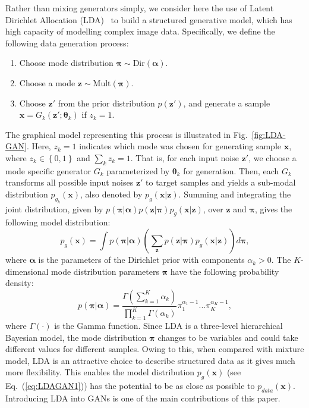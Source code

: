 \documentclass{article}
\begin{document}
Rather than mixing generators simply, we consider here the use of Latent Dirichlet Allocation (LDA)~\cite{blei2003latent} to build a structured generative model, which has high capacity of modelling complex image data.
Specifically, we define the following data generation process:
\begin{enumerate}
\item Choose mode distribution $\bm{\pi}\sim\text{Dir}(\bm{\alpha})$.
\item Choose a mode $\mathbf{z}\sim\text{Mult}(\bm{\pi})$.
\item Choose $\mathbf{z}'$ from the prior distribution $p\left(\mathbf{z}'\right)$, and generate a sample $\mathbf{x}=G_{k}\left(\mathbf{z}'; \bm{\theta}_k\right)$ if $z_k=1$.
\end{enumerate}
The graphical model representing this process is illustrated in Fig.~\ref{fig:LDA-GAN}.
Here, $z_k=1$ indicates which mode was chosen for generating sample $\mathbf{x}$, where $z_k\in\left\{0,1\right\}$ and $\sum_k z_k=1$.
That is, for each input noise $\mathbf{z}'$, we choose a mode specific generator $G_k$ parameterized by $\bm{\theta}_k$ for generation.
Then, each $G_k$ transforms all possible input noises $\mathbf{z}'$ to target samples and yields a sub-modal distribution $p_{g_k}\left(\mathbf{x}\right)$, also denoted by $p_g\left(\mathbf{x}|\mathbf{z}\right)$.
Summing and integrating the joint distribution, given by $p\left(\bm{\pi}|\bm{\alpha}\right)p\left(\mathbf{z}|\bm{\pi}\right) p_g\left(\mathbf{x}|\mathbf{z}\right)$, over $\mathbf{z}$ and $\bm{\pi}$, gives the following model distribution:
\begin{equation}
p_g\left(\mathbf{x}\right)
=
\int p\left(\bm{\pi}|\bm{\alpha}\right)\left(\sum_{\mathbf{z}} p\left(\mathbf{z}|\bm{\pi}\right) p_g\left(\mathbf{x}|\mathbf{z}\right) \right)d\bm{\pi},
\label{eq:LDAGAN1}
\end{equation}
where $\bm{\alpha}$ is the parameters of the Dirichlet prior with components $\alpha_k>0$.
\noindent The $K$-dimensional mode distribution parameters $\bm{\pi}$ have the following probability density:
\begin{equation}
p\left( \bm{\pi}|\bm{\alpha} \right)
=
\frac{\Gamma\left( \sum_{k=1}^K\alpha_k \right)}
{\prod_{k=1}^K\Gamma\left( \alpha_k \right)}
\pi_1^{\alpha_1-1}... \pi_K^{\alpha_K-1},
\label{eq:LDAGAN2}
\end{equation}
where $\Gamma\left(\cdot\right)$ is the Gamma function.
Since LDA is a three-level hierarchical Bayesian model, the mode distribution $\bm{\pi}$ changes to be variables and could take different values for different samples.
Owing to this, when compared with mixture model, LDA is an attractive choice to describe structured data as it gives much more flexibility.
This enables the model distribution $p_g\left(\mathbf{x}\right)$ (see Eq.~(\ref{eq:LDAGAN1})) has the potential to be as close as possible to $p_{data}\left(\mathbf{x}\right)$.
Introducing LDA into GANs is one of the main contributions of this paper.
\end{document}

